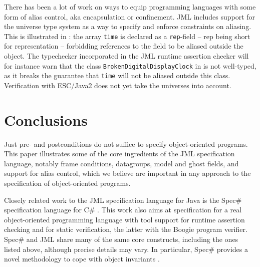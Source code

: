 \documentclass{llncs}
\begin{document}
There has been a lot of work on ways to equip programming languages
with some form of alias control, aka encapsulation or confinement.
JML includes support for the universe type system
\cite{Mueller-Poetzsch-Heffter-Leavens03} as a way to specify
and enforce constraints on aliasing. This is illustrated in 
: the array \texttt{time} is declared
as a \texttt{rep}-field -- rep being short for representation -- forbidding
references to the field to be aliased outside the object.
The typechecker incorporated in the JML runtime assertion checker
will for instance warn that the class \texttt{BrokenDigitalDisplayClock}
in  is not well-typed, as it  breaks 
the guarantee that \texttt{time} will not be aliased outside this class.
Verification with ESC/Java2 does not yet take the universes into account.

% 
%

\section{Conclusions}
\label{Sec:conclusion}

Just pre- and postconditions do not suffice to specify object-oriented
programs.  This paper illustrates some of the core ingredients of the JML
specification language, notably frame conditions, datagroups, model and
ghost fields, and support for alias control, which we believe are important
in any approach to the specification of object-oriented programs.

Closely related work to the JML specification language for Java is the
Spec\# specification language for C\# \cite{SpecSharp}. This work also aims
at specification for a real object-oriented programming language with tool
support for runtime assertion checking and for static verification, the
latter with the Boogie program verifier.  Spec\# and JML share many of the
same core constructs, including the ones listed above, although precise
details may vary.  In particular, Spec\# provides a novel methodology to 
cope with object invariants \cite{BoogieInvariants}.
\end{document}
